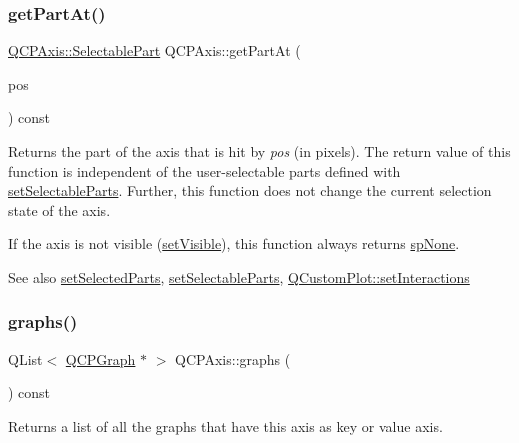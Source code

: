 \subsubsection{\texorpdfstring{get\+Part\+At()}{getPartAt()}}
{\footnotesize\ttfamily \mbox{\hyperlink{class_q_c_p_axis_abee4c7a54c468b1385dfce2c898b115f}{Q\+C\+P\+Axis\+::\+Selectable\+Part}} Q\+C\+P\+Axis\+::get\+Part\+At (\begin{DoxyParamCaption}\item[{const Q\+PointF \&}]{pos }\end{DoxyParamCaption}) const}

Returns the part of the axis that is hit by {\itshape pos} (in pixels). The return value of this function is independent of the user-\/selectable parts defined with \mbox{\hyperlink{class_q_c_p_axis_a513f9b9e326c505d9bec54880031b085}{set\+Selectable\+Parts}}. Further, this function does not change the current selection state of the axis.

If the axis is not visible (\mbox{\hyperlink{class_q_c_p_layerable_a3bed99ddc396b48ce3ebfdc0418744f8}{set\+Visible}}), this function always returns \mbox{\hyperlink{class_q_c_p_axis_abee4c7a54c468b1385dfce2c898b115fae0df8123a5528d5ccf87cb7794f971ea}{sp\+None}}.

\begin{DoxySeeAlso}{See also}
\mbox{\hyperlink{class_q_c_p_axis_ab9d7a69277dcbed9119b3c1f25ca19c3}{set\+Selected\+Parts}}, \mbox{\hyperlink{class_q_c_p_axis_a513f9b9e326c505d9bec54880031b085}{set\+Selectable\+Parts}}, \mbox{\hyperlink{class_q_custom_plot_a5ee1e2f6ae27419deca53e75907c27e5}{Q\+Custom\+Plot\+::set\+Interactions}} 
\end{DoxySeeAlso}
\mbox{\label{class_q_c_p_axis_ad590c0da223697a2727f97a520870fec}} 
\subsubsection{\texorpdfstring{graphs()}{graphs()}}
{\footnotesize\ttfamily Q\+List$<$ \mbox{\hyperlink{class_q_c_p_graph}{Q\+C\+P\+Graph}} $\ast$ $>$ Q\+C\+P\+Axis\+::graphs (\begin{DoxyParamCaption}{ }\end{DoxyParamCaption}) const}

Returns a list of all the graphs that have this axis as key or value axis.

